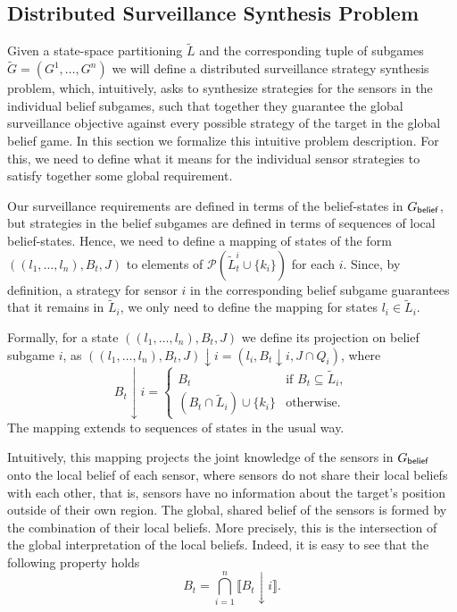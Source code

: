 \subsection{Distributed Surveillance Synthesis Problem}\label{sec:distributed-problem}
Given a state-space partitioning $\widetilde L$ and the corresponding tuple of subgames $\widetilde G = (G^1,\ldots,G^n)$
we will define a distributed surveillance strategy synthesis problem, which, intuitively, asks to synthesize strategies for the sensors in the individual belief subgames, such that together they guarantee the global surveillance objective against every possible strategy of the target in the global belief game.  In this section we formalize this intuitive problem description. For this, we  need to define what it means for the individual sensor strategies to satisfy together some global requirement.

Our surveillance requirements are defined in terms of the belief-states in $G_{\mathsf{belief}}$, but strategies in the belief subgames are defined in terms of sequences of local belief-states. Hence, we need to define a mapping of states of the form $((l_1,\ldots,l_n),B_t,J)$ to elements of $\mathcal{P}(\widetilde{L}^i_t \cup \{k_i\})$ for each $i$. Since, by definition, a strategy for sensor $i$ in the corresponding belief subgame guarantees that it remains in $\widetilde L_i$, we only need to define the mapping for states  $l_i \in\widetilde{L}_i$.

Formally, for a state $((l_1,\ldots,l_n),B_t,J)$  we define its projection on belief subgame $i$, as $((l_1,\ldots,l_n),B_t,J){\downarrow}i = (l_i,B_t{\downarrow}i,J \cap Q_i)$, where
\[B_t{\downarrow}i = \begin{cases}
B_t& \text{if }  B_t \subseteq \widetilde L_i, \\
(B_t \cap \widetilde L_i) \cup \{k_i\} & \text{otherwise}.
\end{cases}\]
The mapping extends to sequences of states in the usual way. 

Intuitively, this mapping projects the joint knowledge of the sensors in $G_{\mathsf{belief}}$ onto the local belief of each sensor, where sensors do not  share their local beliefs with each other, that is, sensors have no information about the target's position outside of their own region. The global, shared belief of the sensors is formed by the combination of their local beliefs. More precisely, this is the intersection of the  global interpretation of the local beliefs. Indeed, it is easy to see that the following property holds
\[B_t = \bigcap_{i=1}^n \llbracket B_t{\downarrow}i\rrbracket.\]


